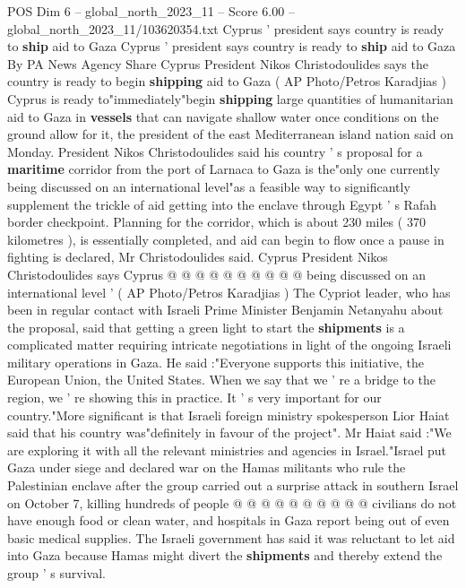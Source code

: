 \begin{textsample}{POS Dim 6 – global\_north\_2023\_11 – Score 6.00 – global\_north\_2023\_11/103620354.txt}  \label{ex:f6_pos_255}
Cyprus ' president says country is ready to \textbf{ship} aid to Gaza Cyprus ' president says country is ready to \textbf{ship} aid to Gaza By PA News Agency Share Cyprus President Nikos Christodoulides says the country is ready to begin \textbf{shipping} aid to Gaza ( AP Photo/Petros Karadjias ) Cyprus is ready to"immediately"begin \textbf{shipping} large quantities of humanitarian aid to Gaza in \textbf{vessels} that can navigate shallow water once conditions on the ground allow for it, the president of the east Mediterranean island nation said on Monday.
President Nikos Christodoulides said his country ' s proposal for a \textbf{maritime} corridor from the port of Larnaca to Gaza is the"only one currently being discussed on an international level"as a feasible way to significantly supplement the trickle of aid getting into the enclave through Egypt ' s Rafah border checkpoint.
Planning for the corridor, which is about 230 miles ( 370 kilometres ), is essentially completed, and aid can begin to flow once a pause in fighting is declared, Mr Christodoulides said.
Cyprus President Nikos Christodoulides says Cyprus @ @ @ @ @ @ @ @ @ @ being discussed on an international level ' ( AP Photo/Petros Karadjias ) The Cypriot leader, who has been in regular contact with Israeli Prime Minister Benjamin Netanyahu about the proposal, said that getting a green light to start the \textbf{shipments} is a complicated matter requiring intricate negotiations in light of the ongoing Israeli military operations in Gaza.
He said :"Everyone supports this initiative, the European Union, the United States.
When we say that we ' re a bridge to the region, we ' re showing this in practice.
It ' s very important for our country."More significant is that Israeli foreign ministry spokesperson Lior Haiat said that his country was"definitely in favour of the project".
Mr Haiat said :"We are exploring it with all the relevant ministries and agencies in Israel."Israel put Gaza under siege and declared war on the Hamas militants who rule the Palestinian enclave after the group carried out a surprise attack in southern Israel on October 7, killing hundreds of people @ @ @ @ @ @ @ @ @ @ civilians do not have enough food or clean water, and hospitals in Gaza report being out of even basic medical supplies.
The Israeli government has said it was reluctant to let aid into Gaza because Hamas might divert the \textbf{shipments} and thereby extend the group ' s survival.

\end{textsample}
